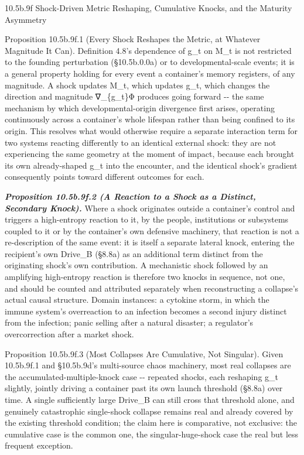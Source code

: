 \documentclass[
]{article}
\begin{document}
10.5b.9f Shock-Driven Metric Reshaping, Cumulative Knocks, and the
Maturity Asymmetry

Proposition 10.5b.9f.1 (Every Shock Reshapes the Metric, at Whatever
Magnitude It Can). Definition 4.8's dependence of g\_t on M\_t is not
restricted to the founding perturbation (§10.5b.0.0a) or to
developmental-scale events; it is a general property holding for every
event a container's memory registers, of any magnitude. A shock updates
M\_t, which updates g\_t, which changes the direction and magnitude
∇\_\{g\_t\}Φ produces going forward -\/- the same mechanism by which
developmental-origin divergence first arises, operating continuously
across a container's whole lifespan rather than being confined to its
origin. This resolves what would otherwise require a separate
interaction term for two systems reacting differently to an identical
external shock: they are not experiencing the same geometry at the
moment of impact, because each brought its own already-shaped g\_t into
the encounter, and the identical shock's gradient consequently points
toward different outcomes for each.

\emph{\textbf{Proposition 10.5b.9f.2 (A Reaction to a Shock as a
Distinct, Secondary Knock).}} Where a shock originates outside a
container's control and triggers a high-entropy reaction to it, by the
people, institutions or subsystems coupled to it or by the container's
own defensive machinery, that reaction is not a re-description of the
same event: it is itself a separate lateral knock, entering the
recipient's own Drive\_B (§8.8a) as an additional term distinct from the
originating shock's own contribution. A mechanistic shock followed by an
amplifying high-entropy reaction is therefore two knocks in sequence,
not one, and should be counted and attributed separately when
reconstructing a collapse's actual causal structure. Domain instances: a
cytokine storm, in which the immune system's overreaction to an
infection becomes a second injury distinct from the infection; panic
selling after a natural disaster; a regulator's overcorrection after a
market shock.

Proposition 10.5b.9f.3 (Most Collapses Are Cumulative, Not Singular).
Given 10.5b.9f.1 and §10.5b.9d's multi-source chaos machinery, most real
collapses are the accumulated-multiple-knock case -\/- repeated shocks,
each reshaping g\_t slightly, jointly driving a container past its own
launch threshold (§8.8a) over time. A single sufficiently large Drive\_B
can still cross that threshold alone, and genuinely catastrophic
single-shock collapse remains real and already covered by the existing
threshold condition; the claim here is comparative, not exclusive: the
cumulative case is the common one, the singular-huge-shock case the real
but less frequent exception.
\end{document}
